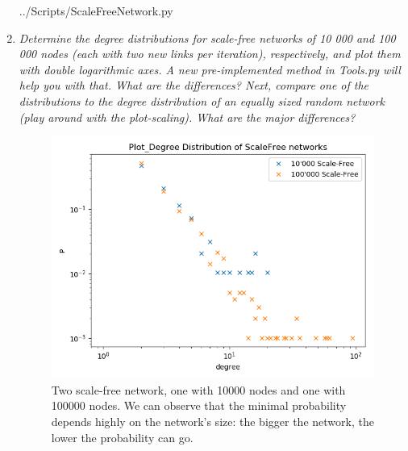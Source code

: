 \documentclass[10pt,a4paper]{article}
\begin{document}
\begin{enumerate}
\newpage
 {../Scripts/ScaleFreeNetwork.py}


\item \textit{Determine the degree distributions for scale-free networks of 10 000 and 100 000 nodes
	(each with two new links per iteration), respectively, and plot them with double logarithmic
	axes. A new pre-implemented method in Tools.py will help you with that. What are the
	differences?
	Next, compare one of the distributions to the degree distribution of an equally sized random
	network (play around with the plot-scaling). What are the major differences?
}\\




\begin{figure}[H]
	\centering
	\includegraphics[width=0.7\linewidth]{"../Scripts/Plot_Degree Distribution of ScaleFree networks"}
	\caption{Two scale-free network, one with 10000 nodes and one with 100000 nodes. We can observe that the minimal probability depends highly on the network's size: the bigger the network, the lower the probability can go.}
	\label{fig:plotdegree-distribution-of-scalefree-networks}
\end{figure}



\end{enumerate}
\end{document}
